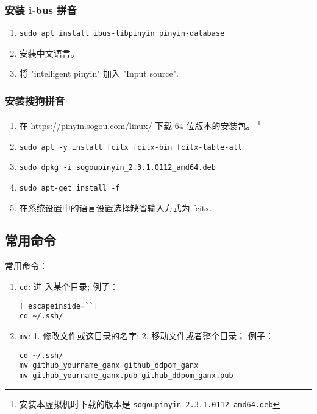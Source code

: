 \documentclass[cn,11pt, simple]{elegantbook}
\begin{document}
\subsubsection{安装 i-bus 拼音}%
\label{ssub:pinyin-i-bus}
\begin{enumerate}
    \item \lstinline{sudo apt install ibus-libpinyin pinyin-database} 
    \item 安装中文语言。
    \item 将 "intelligent pinyin" 加入 "Input source".
\end{enumerate}

\subsubsection{安装搜狗拼音}%
\label{ssub:pinyin-i-bus}
\begin{enumerate}
    \item 在 \href{https://pinyin.sogou.com/linux/}
        {https://pinyin.sogou.com/linux/} 下载 64 位版本的安装包。
        \footnote{安装本虚拟机时下载的版本是
            \lstinline{sogoupinyin_2.3.1.0112_amd64.deb}
        }
    \item \lstinline{sudo apt -y install fcitx fcitx-bin fcitx-table-all} 
    \item \lstinline{sudo dpkg -i sogoupinyin_2.3.1.0112_amd64.deb} 
    \item \lstinline{sudo apt-get install -f}
    \item 在系统设置中的语言设置选择缺省输入方式为 fcitx.
\end{enumerate}

\subsection{常用命令}%
\label{sub:linux-commands}

常用命令：
\begin{enumerate}
    \item \lstinline{cd}: 进 入某个目录; 例子：
\begin{lstlisting}[ escapeinside=``]
cd ~/.ssh/
\end{lstlisting}
    \item \lstinline{mv}: 1. 修改文件或这目录的名字; 2.
        移动文件或者整个目录； 例子：
\begin{lstlisting}[escapeinside=``]
cd ~/.ssh/
mv github_yourname_ganx github_ddpom_ganx
mv github_yourname_ganx.pub github_ddpom_ganx.pub
\end{lstlisting}
\end{enumerate}
\end{document}
